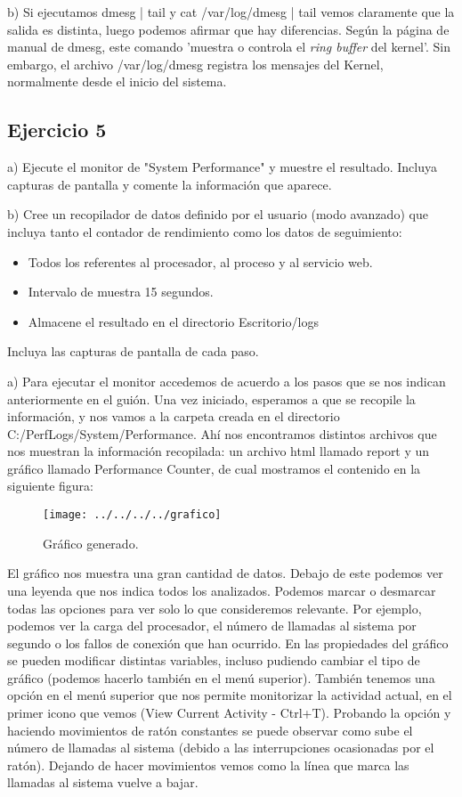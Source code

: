 \documentclass[a4paper, 11pt]{article} %
\begin{document}
b) Si ejecutamos dmesg | tail y cat /var/log/dmesg | tail vemos claramente que la salida es distinta, luego podemos afirmar que hay diferencias. Según la página de manual de dmesg, este comando 'muestra o controla el \textit{ring buffer} del kernel'. Sin embargo, el archivo /var/log/dmesg registra los mensajes del Kernel, normalmente desde el inicio del sistema.

\subsection{Ejercicio 5}
a) Ejecute el monitor de "System Performance" y muestre el resultado. Incluya capturas de pantalla y comente la información que aparece. 

b) Cree un recopilador de datos definido por el usuario (modo avanzado) que incluya tanto el contador de rendimiento como los datos de seguimiento: 
\begin{itemize}
\item Todos los referentes al procesador, al proceso y al servicio web. 
\item Intervalo de muestra 15 segundos.
\item Almacene el resultado en el directorio Escritorio/logs
\end{itemize}
Incluya las capturas de pantalla de cada paso. 

a) Para ejecutar el monitor accedemos de acuerdo a los pasos que se nos indican anteriormente en el guión. Una vez iniciado, esperamos a que se recopile la información, y nos vamos a la carpeta creada en el directorio C:/PerfLogs/System/Performance. Ahí nos encontramos distintos archivos que nos muestran la información recopilada: un archivo html llamado report y un gráfico llamado Performance Counter, de cual mostramos el contenido en la siguiente figura: 
\pagebreak
\begin{figure}[htpb]
\centering
\texttt{[image: ../../../../grafico]}
\caption{Gráfico generado.}
\end{figure}

El gráfico nos muestra una gran cantidad de datos. Debajo de este podemos ver una leyenda que nos indica todos los analizados. Podemos marcar o desmarcar todas las opciones para ver solo lo que consideremos relevante. Por ejemplo, podemos ver la carga del procesador, el número de llamadas al sistema por segundo o los fallos de conexión que han ocurrido. En las propiedades del gráfico se pueden modificar distintas variables, incluso pudiendo cambiar el tipo de gráfico (podemos hacerlo también en el menú superior). También tenemos una opción en el menú superior que nos permite monitorizar la actividad actual, en el primer icono que vemos (View Current Activity - Ctrl+T). Probando la opción y haciendo movimientos de ratón constantes se puede observar como sube el número de llamadas al sistema (debido a las interrupciones ocasionadas por el ratón). Dejando de hacer movimientos vemos como la línea que marca las llamadas al sistema vuelve a bajar. 
\end{document}
